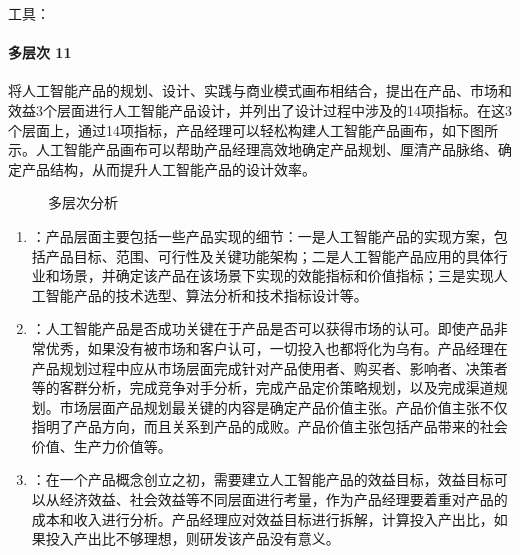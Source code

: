 \documentclass[letterpaper,11pt,english]{sphinxmanual}
\begin{document}
工具：%
\begin{footnote}[120]\sphinxAtStartFootnote
{}
%
\end{footnote}


\paragraph{多层次 11\sphinxfootnotemark[121]}
\label{\detokenize{chapter_idea/business:id4}}%
\begin{footnotetext}[121]\sphinxAtStartFootnote
{}
%
\end{footnotetext}\ignorespaces 
将人工智能产品的规划、设计、实践与商业模式画布相结合，提出在产品、市场和效益3个层面进行人工智能产品设计，并列出了设计过程中涉及的14项指标。在这3个层面上，通过14项指标，产品经理可以轻松构建人工智能产品画布，如下图所示。人工智能产品画布可以帮助产品经理高效地确定产品规划、厘清产品脉络、确定产品结构，从而提升人工智能产品的设计效率。

\begin{figure}[H]
\centering
\capstart

\noindent{}
\caption{多层次分析}\label{\detokenize{chapter_idea/business:id23}}\end{figure}
\begin{enumerate}
%
\item {} 
：产品层面主要包括一些产品实现的细节：一是人工智能产品的实现方案，包括产品目标、范围、可行性及关键功能架构；二是人工智能产品应用的具体行业和场景，并确定该产品在该场景下实现的效能指标和价值指标；三是实现人工智能产品的技术选型、算法分析和技术指标设计等。

\item {} 
：人工智能产品是否成功关键在于产品是否可以获得市场的认可。即使产品非常优秀，如果没有被市场和客户认可，一切投入也都将化为乌有。产品经理在产品规划过程中应从市场层面完成针对产品使用者、购买者、影响者、决策者等的客群分析，完成竞争对手分析，完成产品定价策略规划，以及完成渠道规划。市场层面产品规划最关键的内容是确定产品价值主张。产品价值主张不仅指明了产品方向，而且关系到产品的成败。产品价值主张包括产品带来的社会价值、生产力价值等。

\item {} 
：在一个产品概念创立之初，需要建立人工智能产品的效益目标，效益目标可以从经济效益、社会效益等不同层面进行考量，作为产品经理要着重对产品的成本和收入进行分析。产品经理应对效益目标进行拆解，计算投入产出比，如果投入产出比不够理想，则研发该产品没有意义。

\end{enumerate}
\end{document}
